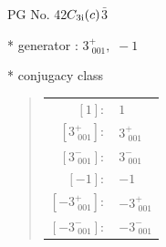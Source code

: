 \documentclass[fleqn,8pt]{jsarticle}
\begin{document}
\setcounter{MaxMatrixCols}{32}

\renewcommand{\tablename}{Table~}
\renewcommand{\figurename}{Figure~}
\begin{center}
\LARGE
PG No. 42\quad$C_{\rm 3i}(c)$\quad$\bar{3}$\quad[ trigonal ]
\end{center}

* generator : $3^{+}_{\,\,001},\,\,-1$

* conjugacy class
\begin{quote}
\begin{tabular}{rl}
$ [1]: $ & $ 1 $ \\
$ [3^{+}_{\,\,001}]: $ & $ 3^{+}_{\,\,001} $ \\
$ [3^{-}_{\,\,001}]: $ & $ 3^{-}_{\,\,001} $ \\
$ [-1]: $ & $ -1 $ \\
$ [-3^{+}_{\,\,001}]: $ & $ -3^{+}_{\,\,001} $ \\
$ [-3^{-}_{\,\,001}]: $ & $ -3^{-}_{\,\,001} $
\end{tabular}
\end{quote}
\end{document}
